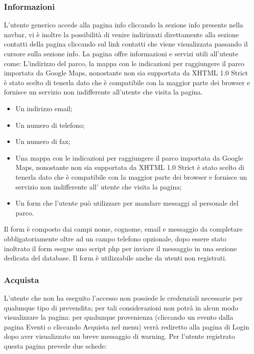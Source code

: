             \subsubsection{Informazioni}
            L’utente generico accede alla pagina info cliccando la sezione info presente nella navbar, vi è inoltre la possibilità di venire indirizzati direttamente alla sezione contatti della pagina cliccando sul link contatti che viene visualizzata passando il cursore sulla sezione info. La pagina offre informazioni e servizi utili all’utente come:
            L’indirizzo del parco, la mappa con le indicazioni per raggiungere il parco importata da Google Maps, nonostante non sia supportata da XHTML 1.0 Strict è stato scelto di tenerla dato che è compatibile con la maggior parte dei browser e fornisce un servizio non indifferente all’utente che visita la pagina.
            \begin{itemize}
                \item Un indirizzo email;
                \item Un numero di telefono;
                \item Un numero di fax;
                \item Una mappa con le indicazioni per raggiungere il parco importata da Google Maps, nonostante non sia supportata da XHTML 1.0 Strict è stato scelto di tenerla dato che è compatibile con la maggior parte dei browser e fornisce un servizio non indifferente all’ utente che visita la pagina;
                \item Un form che l’utente può utilizzare per mandare messaggi al personale del parco.
            \end{itemize}
            Il form è composto dai campi nome, cognome, email e messaggio da completare obbligatoriamente oltre ad un campo telefono opzionale, dopo essere stato inoltrato il form esegue uno script php per inviare il messaggio in una sezione dedicata del database. Il form è utilizzabile anche da utenti non registrati.

        \subsubsection{Acquista}
            L'utente che non ha eseguito l'accesso non possiede le credenziali necessarie per qualunque tipo di prevendita; per tali considerazioni non potrà in alcun modo visualizzare la pagina: per qualunque provenienza (cliccando un evento dalla pagina Eventi o cliccando Acquista nel menu) verrà rediretto alla pagina di Login dopo aver visualizzato un breve messaggio di warning.
            Per l'utente registrato questa pagina prevede due schede:
